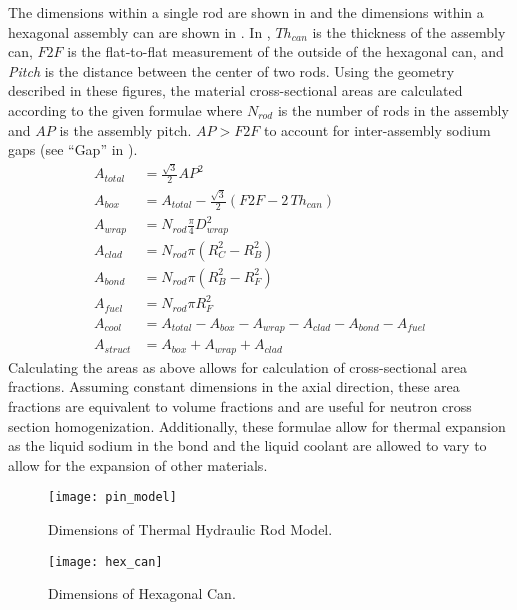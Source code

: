   The dimensions within a single rod are shown in  and the
  dimensions within a hexagonal assembly can are shown in . In
  , $T\!h_{can}$ is the thickness of the assembly can,
  $F\!2\!F$ is the flat-to-flat measurement of the outside of the hexagonal can,
  and \textit{Pitch} is the distance between the center of two rods. Using the
  geometry described in these figures, the material cross-sectional areas are
  calculated according to the given formulae where $N_{rod}$ is the number of
  rods in the assembly and $A\!P$ is the assembly pitch. $A\!P > F\!2\!F$ to
  account for inter-assembly sodium gaps (see ``Gap'' in ).
  \begin{align}
    \label{eq:afrac_first}
    A_{total} &= \frac{\sqrt{3}}{2} A\!P^2 \\
    A_{box} &= A_{total} - 
      \frac{\sqrt{3}}{2} \left(  F\!2\!F - 2 \, T\!h_{can} \right) \\
    A_{wrap} &= N_{rod} \frac{\pi}{4} D_{wrap}^2 \\
    A_{clad} &= N_{rod} \pi (R_C^2 - R_B^2) \\
    A_{bond} &= N_{rod} \pi (R_B^2 - R_F^2) \\
    A_{fuel} &= N_{rod} \pi R_F^2 \\
    A_{cool} &= A_{total} - A_{box} - A_{wrap} - A_{clad} - A_{bond} -
      A_{fuel}\\
    \label{eq:afrac_last}
    A_{struct} &= A_{box} + A_{wrap} + A_{clad}
  \end{align}
  Calculating the areas as above allows for calculation of cross-sectional area
  fractions. Assuming constant dimensions in the axial direction, these area
  fractions are equivalent to volume fractions and are useful for neutron
  cross section homogenization. Additionally, these formulae allow for thermal
  expansion as the liquid sodium in the bond and the liquid coolant are allowed
  to vary to allow for the expansion of other materials.

  \begin{figure}
    \centering
    \texttt{[image: pin\_model]}
    \caption{Dimensions of Thermal Hydraulic Rod Model.}
    \label{fig:pin_model}
  \end{figure}

  \begin{figure}
    \centering
    \texttt{[image: hex\_can]}
    \caption{Dimensions of Hexagonal Can.}
    \label{fig:hex_can}
  \end{figure}

